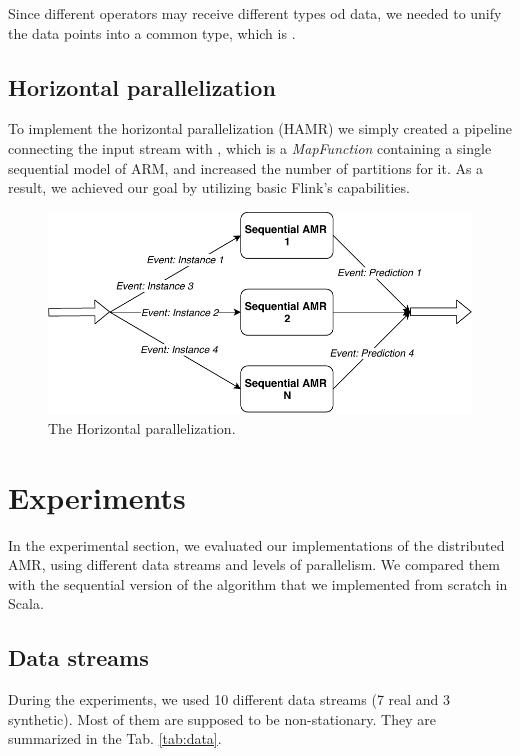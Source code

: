 \documentclass[journal]{IEEEtran}
\newcommand{\textot}[1]{\scalebox{0.95}{\texttt{#1}}}
\begin{document}
\noindent Since different operators may receive different types od data, we needed to unify the data points into a common type, which is \textot{Event}.

\subsection{Horizontal parallelization}

To implement the horizontal parallelization (HAMR) we simply created a pipeline connecting the input stream with \textot{Single Predictor}, which is a \textit{MapFunction} containing a single sequential model of ARM, and increased the number of partitions for it. As a result, we achieved our goal by utilizing basic Flink's capabilities.

\begin{figure}[h]	
	\centering
	\includegraphics[scale=0.55]{img/horizontal.pdf}	
	\caption{The Horizontal parallelization.}	
	\label{fig:horizontal}
\end{figure}

\section{Experiments}

In the experimental section, we evaluated our implementations of the distributed AMR, using different data streams and levels of parallelism. We compared them with the sequential version of the algorithm that we implemented from scratch in Scala.

\subsection{Data streams}

During the experiments, we used 10 different data streams (7 real and 3 synthetic). Most of them are supposed to be non-stationary. They are summarized in the Tab. \ref{tab:data}.
\end{document}
